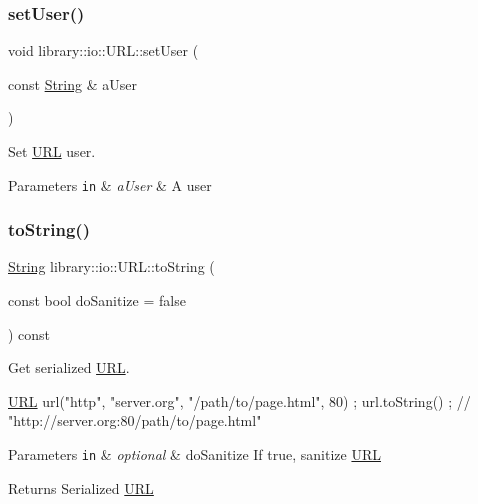 \subsubsection{\texorpdfstring{set\+User()}{setUser()}}
{\footnotesize\ttfamily void library\+::io\+::\+U\+R\+L\+::set\+User (\begin{DoxyParamCaption}\item[{const \hyperlink{namespacelibrary_1_1io_a7469b45835a4421045db344d6a5a1f85}{String} \&}]{a\+User }\end{DoxyParamCaption})}



Set \hyperlink{classlibrary_1_1io_1_1_u_r_l}{U\+RL} user. 


\begin{DoxyParams}[1]{Parameters}
\mbox{\tt in}  & {\em a\+User} & A user \\
\hline
\end{DoxyParams}
\mbox{\label{classlibrary_1_1io_1_1_u_r_l_a0d6ace28a1ecbc7f5d8bffb3aa2a2431}} 
\subsubsection{\texorpdfstring{to\+String()}{toString()}}
{\footnotesize\ttfamily \hyperlink{namespacelibrary_1_1io_a7469b45835a4421045db344d6a5a1f85}{String} library\+::io\+::\+U\+R\+L\+::to\+String (\begin{DoxyParamCaption}\item[{const bool}]{do\+Sanitize = {\ttfamily false} }\end{DoxyParamCaption}) const}



Get serialized \hyperlink{classlibrary_1_1io_1_1_u_r_l}{U\+RL}. 


\begin{DoxyCode}
\hyperlink{classlibrary_1_1io_1_1_u_r_l_a7e9c070138a6dbd000ffb10b7cd8a5c4}{URL} url(\textcolor{stringliteral}{"http"}, \textcolor{stringliteral}{"server.org"}, \textcolor{stringliteral}{"/path/to/page.html"}, 80) ;
url.toString() ; \textcolor{comment}{// "http://server.org:80/path/to/page.html"}
\end{DoxyCode}



\begin{DoxyParams}[1]{Parameters}
\mbox{\tt in}  & {\em optional} & do\+Sanitize If true, sanitize \hyperlink{classlibrary_1_1io_1_1_u_r_l}{U\+RL} \\
\hline
\end{DoxyParams}
\begin{DoxyReturn}{Returns}
Serialized \hyperlink{classlibrary_1_1io_1_1_u_r_l}{U\+RL} 
\end{DoxyReturn}
\mbox{\label{classlibrary_1_1io_1_1_u_r_l_a10de2711247d54ec4dbaf317a0b2ab2c}} 
